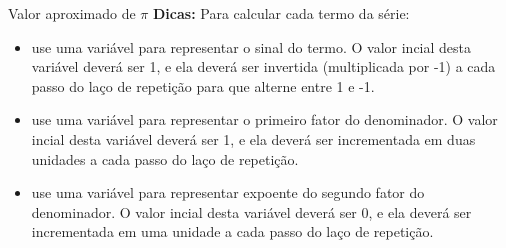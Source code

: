\documentclass[11pt]{practice}
\begin{document}
\begin{task}[breakable]{Valor aproximado de $\pi$}{}
  \textbf{Dicas:} Para calcular cada termo da série:
  \begin{itemize}
    \item use uma variável para representar o sinal do termo. O valor
    incial desta variável deverá ser 1, e ela deverá ser invertida
    (multiplicada por -1) a cada passo do laço de repetição para que
    alterne entre 1 e -1.
    \item use uma variável para representar o primeiro fator do
    denominador. O valor incial desta variável deverá ser 1, e ela
    deverá ser incrementada em duas unidades a cada passo do laço de
    repetição.
    \item use uma variável para representar expoente do segundo fator do
    denominador. O valor incial desta variável deverá ser 0, e ela
    deverá ser incrementada em uma unidade a cada passo do laço de
    repetição.
  \end{itemize}
  \tcblower
  \solution
\end{task}
\end{document}
